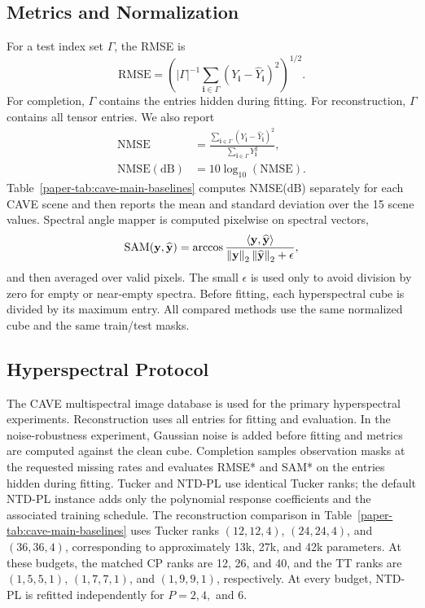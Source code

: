 \subsection{Metrics and Normalization}
\label{supp:metrics}

For a test index set $\Gamma$, the RMSE is
\begin{equation}
  \mathrm{RMSE}
  =
  \left(
  |\Gamma|^{-1}
  \sum_{\mathbf{i}\in\Gamma}
  (Y_{\mathbf{i}}-\widehat{Y}_{\mathbf{i}})^2
  \right)^{1/2}.
\end{equation}
For completion, $\Gamma$ contains the entries hidden during fitting. For
reconstruction, $\Gamma$ contains all tensor entries. We also report
\begin{equation}
  \begin{aligned}
    \mathrm{NMSE}
    &=
    \frac{
      \sum_{\mathbf i\in\Gamma}
      (Y_{\mathbf i}-\widehat Y_{\mathbf i})^2
    }{
      \sum_{\mathbf i\in\Gamma}Y_{\mathbf i}^2
    },\\
    \mathrm{NMSE(dB)}
    &=10\log_{10}(\mathrm{NMSE}).
  \end{aligned}
\end{equation}
Table~\ref{paper-tab:cave-main-baselines} computes NMSE(dB) separately for
each CAVE scene and then reports the mean and standard deviation over the 15
scene values. Spectral angle mapper
is computed pixelwise on spectral vectors,
\begin{equation}
  \mathrm{SAM}(\mathbf{y},\widehat{\mathbf{y}})
  =
  \arccos
  \frac{\left\langle \mathbf{y},\widehat{\mathbf{y}} \right\rangle}
  {\left\lVert \mathbf{y} \right\rVert_2\left\lVert \widehat{\mathbf{y}} \right\rVert_2+\epsilon},
\end{equation}
and then averaged over valid pixels. The small $\epsilon$ is used only to
avoid division by zero for empty or near-empty spectra. Before fitting, each
hyperspectral cube is divided by its maximum entry. All compared methods use
the same normalized cube and the same train/test masks.

\subsection{Hyperspectral Protocol}
\label{supp:hsi-protocol}

The CAVE multispectral image database \cite{cave_multispectral_database,
yasuma2010gapc} is used for the primary hyperspectral experiments. Reconstruction
uses all entries for fitting and evaluation. In the noise-robustness experiment,
Gaussian noise is added before fitting and metrics are computed against the
clean cube. Completion samples observation masks at the requested missing rates
and evaluates RMSE* and SAM* on the entries hidden during fitting. Tucker and
NTD-PL use identical Tucker ranks;
the default NTD-PL instance adds only the polynomial response coefficients and the
associated training schedule.
The reconstruction comparison in
Table~\ref{paper-tab:cave-main-baselines} uses Tucker ranks \((12,12,4)\),
\((24,24,4)\), and \((36,36,4)\), corresponding to approximately 13k, 27k,
and 42k parameters. At these budgets, the matched CP ranks are 12, 26, and 40,
and the TT ranks are \((1,5,5,1)\), \((1,7,7,1)\), and \((1,9,9,1)\),
respectively. At every budget, NTD-PL is refitted independently for
\(P=2,4,\) and \(6\).

